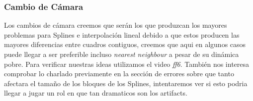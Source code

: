 \subsubsection{Cambio de Cámara}

Los cambios de cámara creemos que serán los que produzcan los mayores problemas para Splines e interpolación lineal debido a que estos producen las mayores diferencias entre cuadros contiguos, creemos que aqui en algunos casos puede llegar a ser preferible incluso \textit{nearest neighbour} a pesar de su dinámica pobre. Para verificar nuestras ideas utilizamos el video \textit{ff6}.
También nos interesa comprobar lo charlado previamente en la sección de errores sobre que tanto afectara el tamaño de los bloques de los Splines, intentaremos ver si esto podria llegar a jugar un rol en que tan dramaticos son los artifacts.


